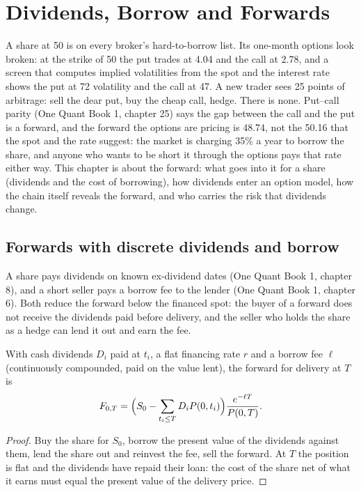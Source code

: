 \chapter{Dividends, Borrow and Forwards}\label{ch:dv:dividends-borrow-and-forwards}

A share at 50 is on every broker's hard-to-borrow list. Its one-month options
look broken: at the strike of 50 the put trades at 4.04 and the call at 2.78,
and a screen that computes implied volatilities from the spot and the interest
rate shows the put at 72 volatility and the call at 47. A new trader sees 25
points of arbitrage: sell the dear put, buy the cheap call, hedge. There is
none. Put--call parity (One Quant Book 1, chapter 25) says the gap between the
call and the put is a forward, and the forward the options are pricing is
48.74, not the 50.16 that the spot and the rate suggest: the market is charging
35\% a year to borrow the share, and anyone who wants to be short it through
the options pays that rate either way. This chapter is about the forward: what
goes into it for a share (dividends and the cost of borrowing), how dividends
enter an option model, how the chain itself reveals the forward, and who carries
the risk that dividends change.

\section{Forwards with discrete dividends and borrow}

A share pays dividends on known ex-dividend dates (One Quant Book 1, chapter 8),
and a short seller pays a borrow fee to the lender (One Quant Book 1, chapter 6).
Both reduce the forward below the financed spot: the buyer of a forward does not
receive the dividends paid before delivery, and the seller who holds the share as
a hedge can lend it out and earn the fee.

\begin{proposition}\label{prop:dv:dividends-borrow-and-forwards:fwd}
With cash dividends $D_i$ paid at $t_i$, a flat financing rate $r$ and a borrow fee
$\ell$ (continuously compounded, paid on the value lent), the forward for delivery
at $T$ is
\[
F_{0,T}=\Bigl(S_0-\sum_{t_i\le T}D_iP(0,t_i)\Bigr)\frac{e^{-\ell T}}{P(0,T)} .
\]
\end{proposition}
\begin{proof}
Buy the share for $S_0$, borrow the present value of the dividends against them,
lend the share out and reinvest the fee, sell the forward. At $T$ the position is
flat and the dividends have repaid their loan: the cost of the share net of what it
earns must equal the present value of the delivery price.
\end{proof}

